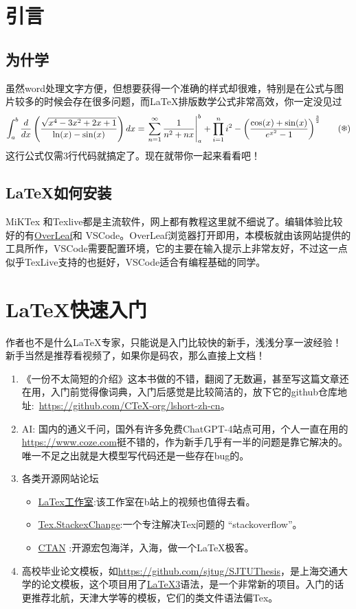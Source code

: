 \section{引言}
\subsection{为什学~\LaTeXe}
虽然word处理文字方便，但想要获得一个准确的样式却很难，特别是在公式与图片较多的时候会存在很多问题，而\LaTeX 排版数学公式非常高效，你一定没见过
\begin{equation}
\int_{a}^{b} \frac{d}{dx}\left( \frac{\sqrt{x^4 - 3x^2 + 2x + 1}}{\ln(x) - \sin(x)} \right) dx =
\left. \sum_{n=1}^{\infty} \frac{1}{n^2 + nx} \right|_{a}^{b} +
\prod_{i=1}^{n} i^2 - \bigg( \frac{\cos(x) + \sin(x)}{e^{x^2} - 1} \bigg)^{\frac{3}{2}} 
\tag{\ding{100}}
\end{equation}
这行公式仅需3行代码就搞定了。现在就带你一起来看看吧！
\subsection{\LaTeX 如何安装}
MiKTex 和Texlive都是主流软件，网上都有教程这里就不细说了。编辑体验比较好的有\href{https://cn.overleaf.com}{OverLeaf}和
VSCode。OverLeaf浏览器打开即用，本模板就由该网站提供的工具所作，VSCode需要配置环境，它的主要在输入提示上非常友好，不过这一点似乎TexLive支持的也挺好，VSCode适合有编程基础的同学。


\section{\LaTeX 快速入门}
作者也不是什么LaTeX专家，只能说是入门比较快的新手，浅浅分享一波经验！
新手当然是推荐看视频了，如果你是码农，那么直接上文档！
\begin{enumerate}
    \item 《一份不太简短的\LaTeXe 介绍》这本书做的不错，翻阅了无数遍，甚至写这篇文章还在用，入门前觉得像词典，入门后感觉是比较简洁的，放下它的github仓库地址:~\url{https://github.com/CTeX-org/lshort-zh-cn}。
    \item AI: 国内的通义千问，国外有许多免费ChatGPT-4站点可用，个人一直在用的\url{https://www.coze.com}挺不错的，作为新手几乎有一半的问题是靠它解决的。唯一不足之出就是大模型写代码还是一些存在bug的。
    \item 各类开源网站论坛
    \begin{itemize}
        \item \href{https://www.latexstudio.net/}{LaTex工作室}:该工作室在b站上的视频也值得去看。
        \item  \href{https://tex.stackexchange.com}{Tex.StackexChange}:一个专注解决Tex问题的 ``stackoverflow''。
        \item \href{https://ctan.org/}{CTAN} :开源宏包海洋，入海，做一个\LaTeX 极客。
    \end{itemize}
    \item  高校毕业论文模板，如\url{https://github.com/sjtug/SJTUThesis}，是上海交通大学的论文模板，这个项目用了\href{https://www.latex-project.org/latex3/}{\LaTeX3}语法，是一个非常新的项目。入门的话更推荐北航，天津大学等的模板，它们的类文件语法偏Tex。
\end{enumerate}


